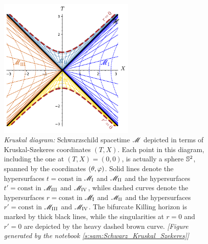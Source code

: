 \begin{figure}
\centerline{\includegraphics[width=0.6\textwidth]{max_kruskal_diag.pdf}}
\caption[]{\label{f:sch:kruskal_diag} \footnotesize
\emph{Kruskal diagram:}
Schwarzschild spacetime $\mathscr{M}$ depicted in terms of Kruskal-Szekeres coordinates $(T,X)$.
Each point in this diagram, including the one at $(T,X)=(0,0)$,
is actually a sphere $\mathbb{S}^2$, spanned by the
coordinates $(\theta,\varphi)$.
Solid lines denote the hypersurfaces $t=\mathrm{const}$ in $\mathscr{M}_{\rm I}$ and
$\mathscr{M}_{\rm II}$ and the  hypersurfaces $t'=\mathrm{const}$ in $\mathscr{M}_{\rm III}$ and
$\mathscr{M}_{\rm IV}$, whiles dashed curves
denote the hypersurfaces $r=\mathrm{const}$ in $\mathscr{M}_{\rm I}$ and
$\mathscr{M}_{\rm II}$ and the  hypersurfaces $r'=\mathrm{const}$ in $\mathscr{M}_{\rm III}$ and
$\mathscr{M}_{\rm IV}$.
The bifurcate Killing horizon is marked by thick black lines, while the
singularities at $r=0$ and $r'=0$ are depicted by the heavy dashed brown curve.
\textsl{[Figure generated by the notebook \ref{s:sam:Schwarz_Kruskal_Szekeres}]}
}
\end{figure}

